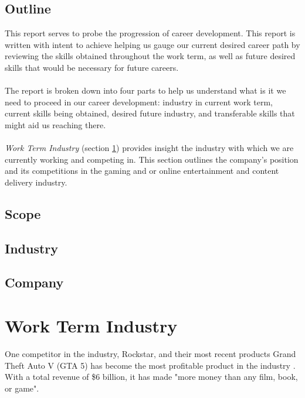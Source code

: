 \documentclass[10pt,letterpaper]{article}
\begin{document}
\subsection{Outline}\label{introduction-outline}

This report serves to probe the progression of career development. This report is written with intent to achieve helping us gauge our current desired career path by reviewing the skills obtained throughout the work term, as well as future desired skills that would be necessary for future careers. \\
\\
The report is broken down into four parts to help us understand what is it we need to proceed in our career development: industry in current work term, current skills being obtained, desired future industry, and transferable skills that might aid us reaching there.\\
\\
\textit{Work Term Industry} (section \ref{work-term-industry}) provides insight the industry with which we are currently working and competing in. This section outlines the company's position and its competitions in the gaming and or online entertainment and content delivery industry.

\subsection{Scope}\label{introduction-scope}

\subsection{Industry}\label{introduction-industry}

\subsection{Company}\label{introduction-company}

\section{Work Term Industry}\label{work-term-industry}

One competitor in the industry, Rockstar, and their most recent products Grand Theft Auto V (GTA 5) has become the most profitable product in the industry \cite{IGN-gta5}. With a total revenue of \$6 billion, it has made "more money than any film, book, or game".
\end{document}

